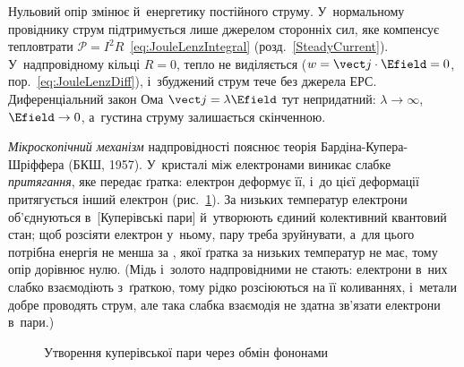 Нульовий опір змінює й~енергетику постійного струму. У~нормальному провіднику струм
підтримується лише джерелом сторонніх сил, яке компенсує тепловтрати $\mathcal
P=I^2R$~\eqref{eq:JouleLenzIntegral} (розд.~\ref{SteadyCurrent}). У~надпровідному кільці
$R=0$, тепло не виділяється ($w=\vect j\cdot\Efield=0$, пор.~\eqref{eq:JouleLenzDiff}),
і~збуджений струм тече без джерела ЕРС. Диференціальний закон Ома $\vect j=\lambda\Efield$
тут непридатний: $\lambda\to\infty$, $\Efield\to0$, а~густина струму залишається
скінченною.

\emph{Мікроскопічний механізм} надпровідності пояснює теорія Бардіна-Купера-Шріффера
(БКШ, 1957). У~кристалі між електронами виникає слабке \emph{притягання}, яке передає
ґратка: електрон деформує її, і~до цієї деформації притягується інший електрон
(рис.~\ref{pic:CooperPair}). За низьких температур електрони об'єднуються
в~[Куперівські пари] й~утворюють єдиний колективний квантовий стан; щоб розсіяти
електрон у~ньому, пару треба зруйнувати, а~для цього потрібна енергія не менша за
, якої ґратка за низьких температур не має, тому опір дорівнює
нулю. (Мідь і~золото надпровідними не стають: електрони в~них слабко взаємодіють
з~ґраткою, тому рідко розсіюються на її коливаннях, і~метали добре проводять струм, але
така слабка взаємодія не здатна зв'язати електрони в~пари.)

\begin{figure}\centering
	\caption{Утворення куперівської пари через обмін фононами\label{pic:CooperPair}}
\end{figure}



